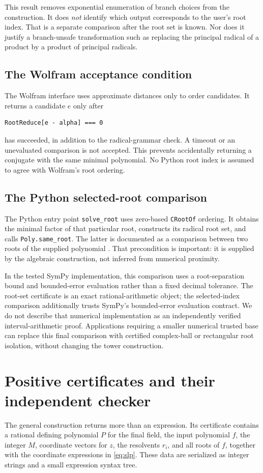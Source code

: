 \documentclass[11pt,a4paper]{article}
\theoremstyle{definition}
\theoremstyle{remark}
\newcommand{\code}[1]{\texttt{#1}}
\begin{document}
This result removes exponential enumeration of branch choices from the
construction. It does \emph{not} identify which output corresponds to the
user's root index. That is a separate comparison after the root set is known.
Nor does it justify a branch-unsafe transformation such as replacing the
principal radical of a product by a product of principal radicals.

\subsection{The Wolfram acceptance condition}
The Wolfram interface uses approximate distances only to order candidates.
It returns a candidate $e$ only after
\begin{lstlisting}
RootReduce[e - alpha] === 0
\end{lstlisting}
has succeeded, in addition to the radical-grammar check. A timeout or an
unevaluated comparison is not accepted. This prevents accidentally returning
a conjugate with the same minimal polynomial. No Python root index is assumed
to agree with Wolfram's root ordering.

\subsection{The Python selected-root comparison}
The Python entry point \code{solve\_root} uses zero-based \code{CRootOf}
ordering. It obtains the minimal factor of that particular root, constructs
its radical root set, and calls \code{Poly.same\_root}. The latter is documented
as a comparison between two roots of the supplied polynomial
\cite{sympyroots}. That precondition is important: it is supplied by the
algebraic construction, not inferred from numerical proximity.

In the tested SymPy implementation, this comparison uses a root-separation
bound and bounded-error evaluation rather than a fixed decimal tolerance.
The root-set certificate is an exact rational-arithmetic object; the
selected-index comparison additionally trusts SymPy's bounded-error
evaluation contract. We do not describe that numerical implementation as an
independently verified interval-arithmetic proof. Applications requiring a
smaller numerical trusted base can replace this final comparison with certified
complex-ball or rectangular root isolation, without changing the tower
construction.

\section{Positive certificates and their independent checker}
\label{sec:certificate}
The general construction returns more than an expression. Its certificate
contains a rational defining polynomial $P$ for the final field, the input
polynomial $f$, the integer $M$, coordinate vectors for $z$, the resolvents
$r_i$, and all roots of $f$, together with the coordinate expressions in
\eqref{eq:slp}. These data are serialized as integer strings and a small
expression syntax tree.
\end{document}
